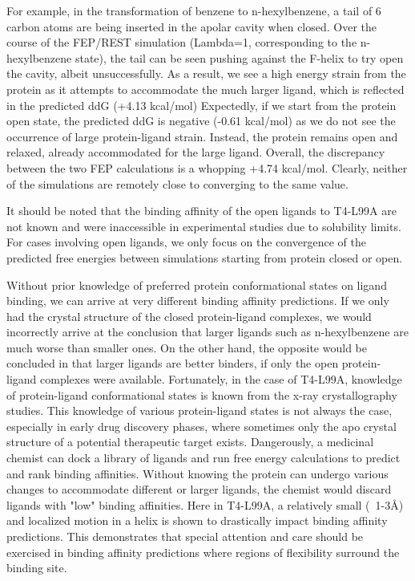 \documentclass{article}
\begin{document}
For example, in the transformation of benzene to n-hexylbenzene, a tail of 6 carbon atoms are being inserted in the apolar cavity when closed.
Over the course of the FEP/REST simulation (Lambda=1, corresponding to the n-hexylbenzene state), the tail can be seen pushing against the F-helix to try open the cavity, albeit unsuccessfully.
As a result, we see a high energy strain from the protein as it attempts to accommodate the much larger ligand, which is reflected in the predicted ddG (+4.13 kcal/mol)
Expectedly, if we start from the protein open state, the predicted ddG is negative (-0.61 kcal/mol) as we do not see the occurrence of large protein-ligand strain.
Instead, the protein remains open and relaxed, already accommodated for the large ligand.
Overall, the discrepancy between the two FEP calculations is a whopping +4.74 kcal/mol.
Clearly, neither of the simulations are remotely close to converging to the same value. 

It should be noted that the binding affinity of the open ligands to T4-L99A are not known and were inaccessible in experimental studies due to solubility limits. \cite{Merski2015}
For cases involving open ligands, we only focus on the convergence of the predicted free energies between simulations starting from protein closed or open.

Without prior knowledge of preferred protein conformational states on ligand binding, we can arrive at very different binding affinity predictions.
If we only had the crystal structure of the closed protein-ligand complexes, we would incorrectly arrive at the conclusion that larger ligands such as n-hexylbenzene are much worse than smaller ones.
On the other hand, the opposite would be concluded in that larger ligands are better binders, if only the open protein-ligand complexes were available.
Fortunately, in the case of T4-L99A, knowledge of protein-ligand conformational states is known from the x-ray crystallography studies. \cite{Merski2015}
This knowledge of various protein-ligand states is not always the case, especially in early drug discovery phases, where sometimes only the apo crystal structure of a potential therapeutic target exists.
Dangerously, a medicinal chemist can dock a library of ligands and run free energy calculations to predict and rank binding affinities.
Without knowing the protein can undergo various changes to accommodate different or larger ligands, the chemist would discard ligands with "low" binding affinities.
Here in T4-L99A, a relatively small (~1-3\AA) and localized motion in a helix is shown to drastically impact binding affinity predictions.
This demonstrates that special attention and care should be exercised in binding affinity predictions where regions of flexibility surround the binding site.
\end{document}
